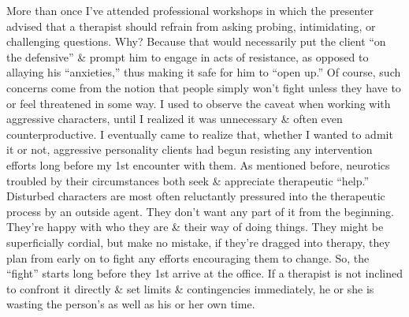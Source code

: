 \documentclass{article}
\numberwithin{equation}{section}
\begin{document}
\begin{itemize}
    More than once I've attended professional workshops in which the presenter advised that a therapist should refrain from asking probing, intimidating, or challenging questions. Why? Because that would necessarily put the client ``on the defensive'' \& prompt him to engage in acts of resistance, as opposed to allaying his ``anxieties,'' thus making it safe for him to ``open up.'' Of course, such concerns come from the notion that people simply won't fight unless they have to or feel threatened in some way. I used to observe the caveat when working with aggressive characters, until I realized it was unnecessary \& often even counterproductive. I eventually came to realize that, whether I wanted to admit it or not, aggressive personality clients had begun resisting any intervention efforts long before my 1st encounter with them. As mentioned before, neurotics troubled by their circumstances both seek \& appreciate therapeutic ``help.'' Disturbed characters are most often reluctantly pressured into the therapeutic process by an outside agent. They don't want any part of it from the beginning. They're happy with who they are \& their way of doing things. They might be superficially cordial, but make no mistake, if they're dragged into therapy, they plan from early on to fight any efforts encouraging them to change. So, the ``fight'' starts long before they 1st arrive at the office. If a therapist is not inclined to confront it directly \& set limits \& contingencies immediately, he or she is wasting the person's as well as his or her own time.
    

\end{itemize}
\end{document}
